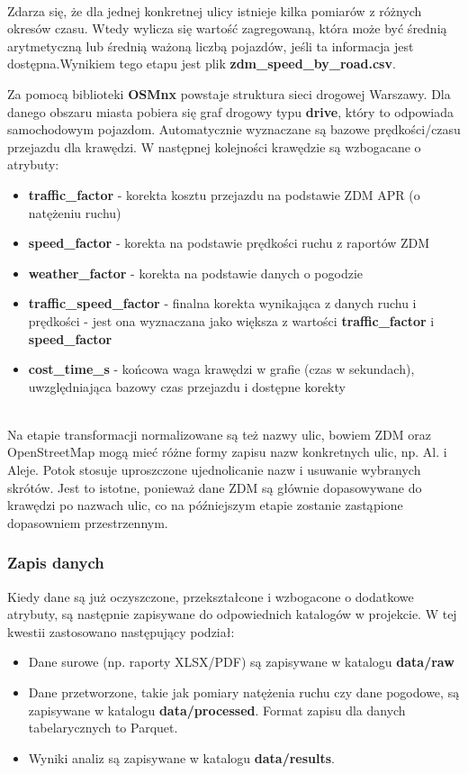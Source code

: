 \documentclass[12pt]{article}
\begin{document}
\noindent \\Zdarza się, że dla jednej konkretnej ulicy istnieje kilka pomiarów z różnych okresów czasu. Wtedy wylicza się wartość zagregowaną, która może być średnią arytmetyczną lub średnią ważoną liczbą pojazdów, jeśli ta informacja jest dostępna.Wynikiem tego etapu jest plik \textbf{zdm\_speed\_by\_road.csv}.

\newpage

\noindent Za pomocą biblioteki \textbf{OSMnx} powstaje struktura sieci drogowej Warszawy. Dla danego obszaru miasta pobiera się graf drogowy typu \textbf{drive}, który to odpowiada samochodowym pojazdom. Automatycznie wyznaczane są bazowe prędkości/czasu przejazdu dla krawędzi. W następnej kolejności krawędzie są wzbogacane o atrybuty:
\begin{itemize}
    \item \textbf{traffic\_factor} - korekta kosztu przejazdu na podstawie ZDM APR (o natężeniu ruchu)
    \item \textbf{speed\_factor} - korekta na podstawie prędkości ruchu z raportów ZDM
    \item \textbf{weather\_factor} - korekta na podstawie danych o pogodzie
    \item \textbf{traffic\_speed\_factor} - finalna korekta wynikająca z danych ruchu i prędkości - jest ona wyznaczana jako większa z wartości \textbf{traffic\_factor} i \textbf{speed\_factor}
    \item \textbf{cost\_time\_s} - końcowa waga krawędzi w grafie (czas w sekundach), uwzględniająca bazowy czas przejazdu i dostępne korekty
\end{itemize}

\noindent \\Na etapie transformacji normalizowane są też nazwy ulic, bowiem ZDM oraz OpenStreetMap mogą mieć różne formy zapisu nazw konkretnych ulic, np. Al. i Aleje. Potok stosuje uproszczone ujednolicanie nazw i usuwanie wybranych skrótów. Jest to istotne, ponieważ dane ZDM są głównie dopasowywane do krawędzi po nazwach ulic, co na późniejszym etapie zostanie zastąpione dopasowniem przestrzennym.\\


\subsubsection{Zapis danych}

\noindent Kiedy dane są już oczyszczone, przekształcone i wzbogacone o dodatkowe atrybuty, są następnie zapisywane do odpowiednich katalogów w projekcie. W tej kwestii zastosowano następujący podział:
\begin{itemize}
    \item Dane surowe (np. raporty XLSX/PDF) są zapisywane w katalogu \textbf{data/raw}
    \item Dane przetworzone, takie jak pomiary natężenia ruchu czy dane pogodowe, są zapisywane w katalogu \textbf{data/processed}. Format zapisu dla danych tabelarycznych to Parquet.
    \item Wyniki analiz są zapisywane w katalogu \textbf{data/results}. 
\end{itemize}
\end{document}
